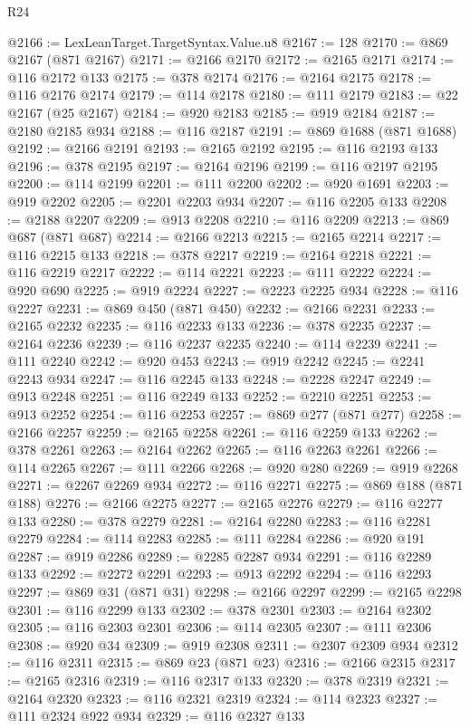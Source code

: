 \begin{lexlean}{R24}
\begin{coremodule}
{{{{{{{{{{{{{{{{{{{{{{{{{{{{{{{{{{{{{{{{{{{{{{{{{{{{{{{{{{{{{{{{{{{{{{{{{{{{{{{{{{{{{{{{{{{{{{{{{{{{{{{{{{{{{{{{{{{{{{{{{{{{{{{{{{{{{{{{{{{{{{{{{{{{{{{{{{{{{{{{{{{{{{{{{{{{{{{{{{{{{{{{{{{{{{{{{{{@2166 := LexLeanTarget.TargetSyntax.Value.u8
@2167 := 128
@2170 := @869 @2167 (@871 @2167)
@2171 := @2166 @2170
@2172 := @2165 @2171
@2174 := @116 @2172 @133
@2175 := @378 @2174
@2176 := @2164 @2175
@2178 := @116 @2176 @2174
@2179 := @114 @2178
@2180 := @111 @2179
@2183 := @22 @2167 (@25 @2167)
@2184 := @920 @2183
@2185 := @919 @2184
@2187 := @2180 @2185 @934
@2188 := @116 @2187
@2191 := @869 @1688 (@871 @1688)
@2192 := @2166 @2191
@2193 := @2165 @2192
@2195 := @116 @2193 @133
@2196 := @378 @2195
@2197 := @2164 @2196
@2199 := @116 @2197 @2195
@2200 := @114 @2199
@2201 := @111 @2200
@2202 := @920 @1691
@2203 := @919 @2202
@2205 := @2201 @2203 @934
@2207 := @116 @2205 @133
@2208 := @2188 @2207
@2209 := @913 @2208
@2210 := @116 @2209
@2213 := @869 @687 (@871 @687)
@2214 := @2166 @2213
@2215 := @2165 @2214
@2217 := @116 @2215 @133
@2218 := @378 @2217
@2219 := @2164 @2218
@2221 := @116 @2219 @2217
@2222 := @114 @2221
@2223 := @111 @2222
@2224 := @920 @690
@2225 := @919 @2224
@2227 := @2223 @2225 @934
@2228 := @116 @2227
@2231 := @869 @450 (@871 @450)
@2232 := @2166 @2231
@2233 := @2165 @2232
@2235 := @116 @2233 @133
@2236 := @378 @2235
@2237 := @2164 @2236
@2239 := @116 @2237 @2235
@2240 := @114 @2239
@2241 := @111 @2240
@2242 := @920 @453
@2243 := @919 @2242
@2245 := @2241 @2243 @934
@2247 := @116 @2245 @133
@2248 := @2228 @2247
@2249 := @913 @2248
@2251 := @116 @2249 @133
@2252 := @2210 @2251
@2253 := @913 @2252
@2254 := @116 @2253
@2257 := @869 @277 (@871 @277)
@2258 := @2166 @2257
@2259 := @2165 @2258
@2261 := @116 @2259 @133
@2262 := @378 @2261
@2263 := @2164 @2262
@2265 := @116 @2263 @2261
@2266 := @114 @2265
@2267 := @111 @2266
@2268 := @920 @280
@2269 := @919 @2268
@2271 := @2267 @2269 @934
@2272 := @116 @2271
@2275 := @869 @188 (@871 @188)
@2276 := @2166 @2275
@2277 := @2165 @2276
@2279 := @116 @2277 @133
@2280 := @378 @2279
@2281 := @2164 @2280
@2283 := @116 @2281 @2279
@2284 := @114 @2283
@2285 := @111 @2284
@2286 := @920 @191
@2287 := @919 @2286
@2289 := @2285 @2287 @934
@2291 := @116 @2289 @133
@2292 := @2272 @2291
@2293 := @913 @2292
@2294 := @116 @2293
@2297 := @869 @31 (@871 @31)
@2298 := @2166 @2297
@2299 := @2165 @2298
@2301 := @116 @2299 @133
@2302 := @378 @2301
@2303 := @2164 @2302
@2305 := @116 @2303 @2301
@2306 := @114 @2305
@2307 := @111 @2306
@2308 := @920 @34
@2309 := @919 @2308
@2311 := @2307 @2309 @934
@2312 := @116 @2311
@2315 := @869 @23 (@871 @23)
@2316 := @2166 @2315
@2317 := @2165 @2316
@2319 := @116 @2317 @133
@2320 := @378 @2319
@2321 := @2164 @2320
@2323 := @116 @2321 @2319
@2324 := @114 @2323
@2327 := @111 @2324 @922 @934
@2329 := @116 @2327 @133
}}}}}}}}}}}}}}}}}}}}}}}}}}}}}}}}}}}}}}}}}}}}}}}}}}}}}}}}}}}}}}}}}}}}}}}}}}}}}}}}}}}}}}}}}}}}}}}}}}}}}}}}}}}}}}}}}}}}}}}}}}}}}}}}}}}}}}}}}}}}}}}}}}}}}}}}}}}}}}}}}}}}}}}}}}}}}}}}}}}}}}}}}}}}}}}}}}}
\end{coremodule}
\end{lexlean}
